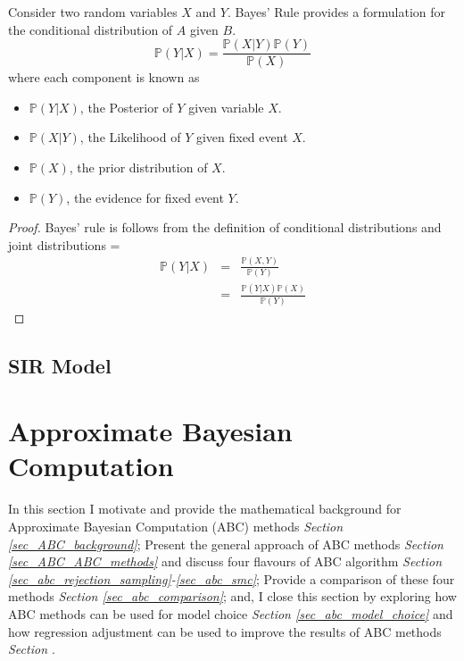 \documentclass[bibliography=totoc,11pt,a4paper,margin=0]{article}
\newcommand*{\prob}{\mathbb{P}}
\theoremstyle{break}
\begin{document}
  \begin{box_theorem}\label{the_bayes_rule}
    Consider two random variables $X$ and $Y$. Bayes' Rule provides a formulation for the conditional distribution of $A$ given $B$.
    \[ \prob(Y|X)=\frac{\prob(X|Y)\prob(Y)}{\prob(X)} \]
    where each component is known as
    \begin{itemize}
      \item $\prob(Y|X)$, the Posterior of $Y$ given variable $X$.
      \item $\prob(X|Y)$, the Likelihood of $Y$ given fixed event $X$.
      \item $\prob(X)$, the prior distribution of $X$.
      \item $\prob(Y)$, the evidence for fixed event $Y$.
    \end{itemize}
    \begin{proof}
      Bayes' rule is follows from the definition of conditional distributions and joint distributions
      \everymath={\displaystyle}
      \[\begin{array}{rcl}
        \prob(Y|X)&=&\frac{\prob(X,Y)}{\prob(Y)}\\
        &=&\frac{\prob(Y|X)\prob(X)}{\prob(Y)}
      \end{array}\]
    \end{proof}
  \end{box_theorem}

\subsection{SIR Model}

\newpage
\section{Approximate Bayesian Computation}\label{sec_ABC}

    In this section I motivate and provide the mathematical background for Approximate Bayesian Computation (ABC) methods \textit{Section \ref{sec_ABC_background}}; Present the general approach of ABC methods \textit{Section \ref{sec_ABC_ABC_methods}} and discuss four flavours of ABC algorithm \textit{Section \ref{sec_abc_rejection_sampling}-\ref{sec_abc_smc}}; Provide a comparison of these four methods \textit{Section \ref{sec_abc_comparison}}; and, I close this section by exploring how ABC methods can be used for model choice \textit{Section \ref{sec_abc_model_choice}} and how regression adjustment can be used to improve the results of ABC methods \textit{Section \label{sec_abc_regression_adjustment}}.
\end{document}
